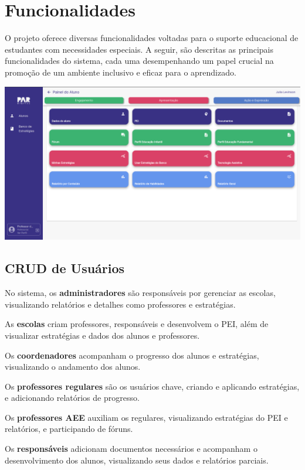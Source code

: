 \documentclass[sigconf]{webmedia}
\begin{document}
\section{Funcionalidades}

O projeto oferece diversas funcionalidades voltadas para o suporte
educacional de estudantes com necessidades especiais. A seguir, são
descritas as principais funcionalidades do sistema, cada uma desempenhando
 um papel crucial na promoção de um ambiente inclusivo e eficaz para o
 aprendizado.
\vspace{0.5cm}

\includegraphics[scale=0.12]{./imgs/painel}

\subsection{CRUD de Usuários}
No sistema, os {\bfseries administradores} são responsáveis por gerenciar as
escolas, visualizando relatórios e detalhes como professores e
estratégias.



As {\bfseries escolas}  criam professores, responsáveis e
desenvolvem o PEI, além de visualizar estratégias e dados dos alunos
e professores.

Os {\bfseries coordenadores}  acompanham o progresso dos alunos
e estratégias, visualizando o andamento dos alunos.

Os {\bfseries professores
regulares}  são os usuários chave, criando e aplicando estratégias, e
adicionando relatórios de progresso.

Os {\bfseries professores AEE}  auxiliam
os regulares, visualizando estratégias do PEI e relatórios, e
participando de fóruns.

Os {\bfseries responsáveis}  adicionam documentos
necessários e acompanham o desenvolvimento dos alunos, visualizando
seus dados e relatórios parciais.
\end{document}
